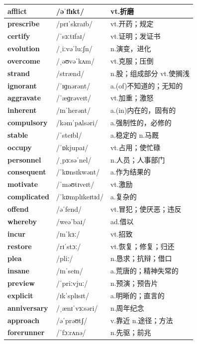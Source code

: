 \documentclass[14pt,a4paper]{extarticle}
\begin{document}
\begin{longtable}{ p{} p{} p{} }
\textbf{afflict} & /əˈflɪkt/ & vt.折磨 \\ \hline
\textbf{prescribe} & /prɪˈskraɪb/ & vt.开药；规定 \\ \hline
\textbf{certify} & /ˈsɜːtɪfaɪ/ & vt.证明；发证书 \\ \hline
\textbf{evolution} & /ˌiːvəˈluːʃn/ & n.演变，进化 \\ \hline
\textbf{overcome} & /ˌəʊvəˈkʌm/ & vt.克服；压倒 \\ \hline
\textbf{strand} & /strænd/ & n.股；组成部分 \quad vt.使搁浅 \\ \hline
\textbf{ignorant} & /ˈɪɡnərənt/ & a.(of)不知道的；无知的 \\ \hline
\textbf{aggravate} & /ˈæɡrəveɪt/ & vt.加重；激怒 \\ \hline
\textbf{inherent} & /ɪnˈherənt/ & a.(in)内在的，固有的 \\ \hline
\textbf{compulsory} & /kəmˈpʌlsəri/ & a.强制性的，必修的 \\ \hline
\textbf{stable} & /ˈsteɪbl/ & a.稳定的 \quad n.马厩 \\ \hline
\textbf{occupy} & /ˈɒkjupaɪ/ & vt.占用；使忙碌 \\ \hline
\textbf{personnel} & /ˌpɜːsəˈnel/ & n.人员；人事部门 \\ \hline
\textbf{consequent} & /ˈkɒnsɪkwənt/ & a.作为结果的 \\ \hline
\textbf{motivate} & /ˈməʊtɪveɪt/ & vt.激励 \\ \hline
\textbf{complicated} & /ˈkɒmplɪkeɪtɪd/ & a.复杂的 \\ \hline
\textbf{offend} & /əˈfend/ & vt.冒犯；使厌恶；违反 \\ \hline
\textbf{whereby} & /weəˈbaɪ/ & ad.借以 \\ \hline
\textbf{incur} & /ɪnˈkɜː/ & vt.招致 \\ \hline
\textbf{restore} & /rɪˈstɔː/ & vt.恢复；修复；归还 \\ \hline
\textbf{plea} & /pliː/ & n.恳求；抗辩；借口 \\ \hline
\textbf{insane} & /ɪnˈseɪn/ & a.荒唐的；精神失常的 \\ \hline
\textbf{preview} & /ˈpriːvjuː/ & n.预演；预告片 \\ \hline
\textbf{explicit} & /ɪkˈsplɪsɪt/ & a.明晰的；直言的 \\ \hline
\textbf{anniversary} & /ˌænɪˈvɜːsəri/ & n.周年纪念 \\ \hline
\textbf{approach} & /əˈprəʊtʃ/ & v.靠近 \quad n.途径；方法 \\ \hline
\textbf{forerunner} & /ˈfɔːrʌnə/ & n.先驱；前兆 \\ \hline

\end{longtable}
\end{document}
